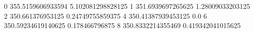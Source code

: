 0 355.5159606933594 5.102081298828125
1 351.6939697265625 1.28009033203125
2 350.661376953125 0.24749755859375
4 350.41387939453125 0.0
6 350.59234619140625 0.178466796875
8 350.8332214355469 0.419342041015625
